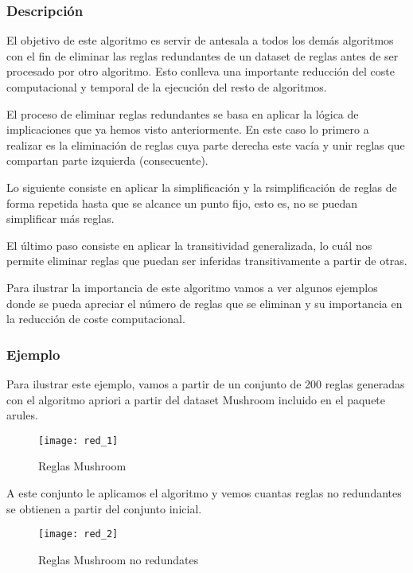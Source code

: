 \subsubsection{Descripci\'on} 

El objetivo de este algoritmo es servir de antesala a todos los dem\'as algoritmos con el fin de eliminar las reglas redundantes de un dataset de reglas antes de ser procesado por otro algoritmo. Esto conlleva una importante reducci\'on del coste computacional y temporal de la ejecuci\'on del resto de algoritmos.

El proceso de eliminar reglas redundantes se basa en aplicar la l\'ogica de implicaciones que ya hemos visto anteriormente. En este caso lo primero a realizar es la eliminaci\'on de reglas cuya parte derecha este vac\'ia y unir reglas que compartan parte izquierda (consecuente).

Lo siguiente consiste en aplicar la simplificaci\'on y la rsimplificaci\'on de reglas de forma repetida hasta que se alcance un punto fijo, esto es, no se puedan simplificar m\'as reglas.

El \'ultimo paso consiste en aplicar la transitividad generalizada, lo cu\'al nos permite eliminar reglas que puedan ser inferidas transitivamente a partir de otras.

Para ilustrar la importancia de este algoritmo vamos a ver algunos ejemplos donde se pueda apreciar el n\'umero de reglas que se eliminan y su importancia en la reducci\'on de coste computacional.

\subsubsection{Ejemplo}

Para ilustrar este ejemplo, vamos a partir de un conjunto de 200 reglas generadas con el algoritmo apriori a partir del dataset Mushroom incluido en el paquete arules.

\begin{figure}[H]
    \centering
    \texttt{[image: red\_1]}
    \caption{Reglas Mushroom}
    \label{fig:red_1}
\end{figure} 

A este conjunto le aplicamos el algoritmo y vemos cuantas reglas no redundantes se obtienen a partir del conjunto inicial.

\begin{figure}[H]
    \centering
    \texttt{[image: red\_2]}
    \caption{Reglas Mushroom no redundates}
    \label{fig:red_2}
\end{figure} 

